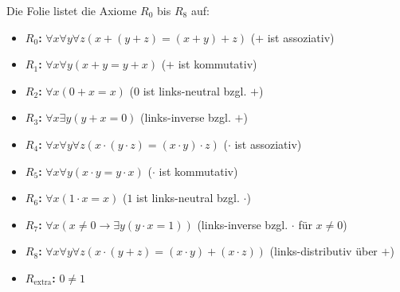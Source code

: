 \begin{meta-note}
Die Folie listet die Axiome $R_0$ bis $R_8$ auf:
\begin{itemize}
    \item \textbf{$R_0$:} $\forall x \forall y \forall z (x + (y + z) = (x + y) + z)$ ($+$ ist assoziativ)
    \item \textbf{$R_1$:} $\forall x \forall y (x + y = y + x)$ ($+$ ist kommutativ)
    \item \textbf{$R_2$:} $\forall x (0 + x = x)$ ($0$ ist links-neutral bzgl. $+$)
    \item \textbf{$R_3$:} $\forall x \exists y (y + x = 0)$ (links-inverse bzgl. $+$)
    \item \textbf{$R_4$:} $\forall x \forall y \forall z (x \cdot (y \cdot z) = (x \cdot y) \cdot z)$ ($\cdot$ ist assoziativ)
    \item \textbf{$R_5$:} $\forall x \forall y (x \cdot y = y \cdot x)$ ($\cdot$ ist kommutativ)
    \item \textbf{$R_6$:} $\forall x (1 \cdot x = x)$ ($1$ ist links-neutral bzgl. $\cdot$)
    \item \textbf{$R_7$:} $\forall x (x \neq 0 \to \exists y (y \cdot x = 1))$ (links-inverse bzgl. $\cdot$ für $x \neq 0$)
    \item \textbf{$R_8$:} $\forall x \forall y \forall z (x \cdot (y + z) = (x \cdot y) +(x \cdot z))$ (links-distributiv über $+$)
    \item \textbf{$R_{\text{extra}}$:} $0 \neq 1$
\end{itemize}
\end{meta-note}

